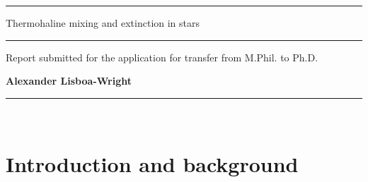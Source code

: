 \documentclass[12pt, a4paper]{report}
\begin{document}
\begin{titlepage}

\vspace*{-0.4cm}

\begin{center}
\hrule
\vspace*{0.5cm}
{\Huge \sc Thermohaline mixing and extinction in stars \par}
\vspace*{0.5cm}
\hrule

\vspace*{5mm}
{\normalsize Report submitted for the application for transfer from M.Phil. to Ph.D.}

\vfill

{\bf Alexander Lisboa-Wright}

\end{center}

\vspace*{1.0cm}

\hrule
\vspace*{0.2cm}
\\

\end{titlepage}

\begin{abstract}
So far in this project, the potential effects of thermohaline mixing in red-giant branch star models have been studied and their projected effect on local mass fractions of $^{14}$N has been calculated. This effect is deemed to be highly significant, which will allow for the full implementation of thermohaline mixing in the models.
The impact of fundamental stellar parameters on the ratio of values of interstellar extinction in different telescope filters has also been studied. The impact is significant and has been partially modelled using simple functions of the stellar parameters, a process which is ongoing at the time of writing.
\end{abstract}

\chapter{Introduction and background}
\end{document}
